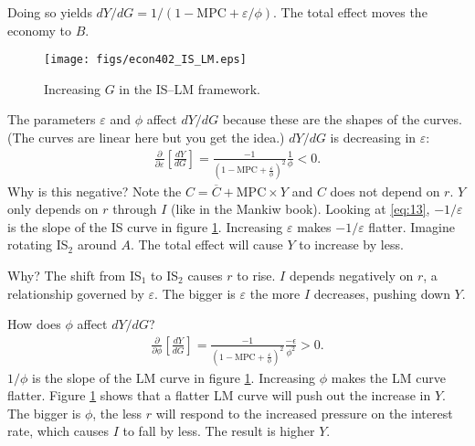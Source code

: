 \documentclass[12pt]{pracjourn_rwr}
\theoremstyle{definition}
\theoremstyle{remark}
\begin{document}
Doing so yields $d Y/ d G = 1 / ( 1 - \text{MPC} + \varepsilon / \phi)$.
The total effect moves the economy to $B$.

\begin{figure}[htbp]
\centerline{\texttt{[image: figs/econ402\_IS\_LM.eps]}}
\caption[]{\label{fig:is-lm} Increasing $G$ in the IS--LM framework.}
\end{figure}

The parameters $\varepsilon$ and $\phi$ affect $d Y/ d G$ because these are the shapes of the curves.
(The curves are linear here but you get the idea.)
$d Y / d G$ is decreasing in $\varepsilon$:
\begin{align*}
\frac{\partial}{\partial \varepsilon} \left[ \frac{d Y}{d G} \right] =
\frac{-1}{\left( 1 - \text{MPC} + \frac{\varepsilon}{\phi} \right)^{2}} \frac{1}{\phi} < 0.
\end{align*}
Why is this negative?
Note the $C = \overline{C} + \text{MPC} \times Y$ and $C$ does not depend on $r$.
$Y$ only depends on $r$ through $I$ (like in the Mankiw book).
Looking at \eqref{eq:13},
$-1 / \varepsilon$ is the slope of the IS curve in figure \ref{fig:is-lm}.
Increasing $\varepsilon$ makes $-1/\varepsilon$ flatter.
Imagine rotating IS$_{2}$ around $A$.
The total effect will cause $Y$ to increase by less.

Why?
The shift from IS$_{1}$ to IS$_{2}$ causes $r$ to rise.
$I$ depends negatively on $r$, a relationship governed by $\varepsilon$.
The bigger is $\varepsilon$ the more $I$ decreases, pushing down $Y$.

How does $\phi$ affect $d Y / d G$?
\begin{align*}
\frac{\partial}{\partial \phi} \left[ \frac{d Y}{d G} \right] =
\frac{-1}{\left( 1 - \text{MPC} + \frac{\varepsilon}{\phi} \right)^{2}} \frac{-\epsilon}{\phi^{2}} > 0.
\end{align*}
$1 / \phi$ is the slope of the LM curve in figure \ref{fig:is-lm}.
Increasing $\phi$ makes the LM curve flatter.
Figure \ref{fig:is-lm} shows that a flatter LM curve will push out the increase in $Y$.
The bigger is $\phi$, the less $r$ will respond to the increased pressure on the interest rate,
which causes $I$ to fall by less.
The result is higher $Y$.

% 
% 
\end{document}
